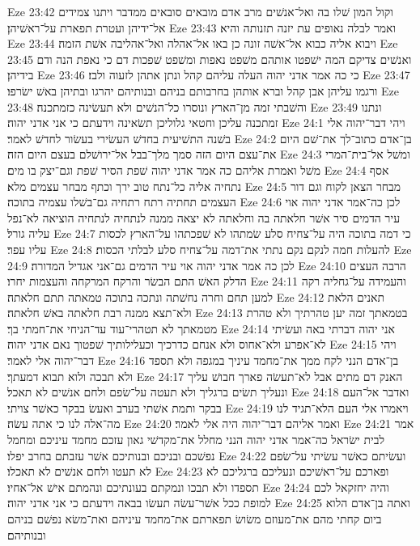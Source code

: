 Eze 23:42  וקול המון שׁלו בה ואל־אנשׁים מרב אדם מובאים סובאים ממדבר ויתנו צמידים אל־ידיהן ועטרת תפארת על־ראשׁיהן׃
Eze 23:43  ואמר לבלה נאופים עת יזנה תזנותה והיא׃
Eze 23:44  ויבוא אליה כבוא אל־אשׁה זונה כן באו אל־אהלה ואל־אהליבה אשׁת הזמה׃
Eze 23:45  ואנשׁים צדיקם המה ישׁפטו אותהם משׁפט נאפות ומשׁפט שׁפכות דם כי נאפת הנה ודם בידיהן׃
Eze 23:46  כי כה אמר אדני יהוה העלה עליהם קהל ונתן אתהן לזעוה ולבז׃
Eze 23:47  ורגמו עליהן אבן קהל וברא אותהן בחרבותם בניהם ובנותיהם יהרגו ובתיהן באשׁ ישׂרפו׃
Eze 23:48  והשׁבתי זמה מן־הארץ ונוסרו כל־הנשׁים ולא תעשׂינה כזמתכנה׃
Eze 23:49  ונתנו זמתכנה עליכן וחטאי גלוליכן תשׂאינה וידעתם כי אני אדני יהוה׃
Eze 24:1  ויהי דבר־יהוה אלי בשׁנה התשׁיעית בחדשׁ העשׂירי בעשׂור לחדשׁ לאמר׃
Eze 24:2  בן־אדם כתוב־לך את־שׁם היום את־עצם היום הזה סמך מלך־בבל אל־ירושׁלם בעצם היום הזה׃
Eze 24:3  ומשׁל אל־בית־המרי משׁל ואמרת אליהם כה אמר אדני יהוה שׁפת הסיר שׁפת וגם־יצק בו מים׃
Eze 24:4  אסף נתחיה אליה כל־נתח טוב ירך וכתף מבחר עצמים מלא׃
Eze 24:5  מבחר הצאן לקוח וגם דור העצמים תחתיה רתח רתחיה גם־בשׁלו עצמיה בתוכה׃
Eze 24:6  לכן כה־אמר אדני יהוה אוי עיר הדמים סיר אשׁר חלאתה בה וחלאתה לא יצאה ממנה לנתחיה לנתחיה הוציאה לא־נפל עליה גורל׃
Eze 24:7  כי דמה בתוכה היה על־צחיח סלע שׂמתהו לא שׁפכתהו על־הארץ לכסות עליו עפר׃
Eze 24:8  להעלות חמה לנקם נקם נתתי את־דמה על־צחיח סלע לבלתי הכסות׃
Eze 24:9  לכן כה אמר אדני יהוה אוי עיר הדמים גם־אני אגדיל המדורה׃
Eze 24:10  הרבה העצים הדלק האשׁ התם הבשׂר והרקח המרקחה והעצמות יחרו׃
Eze 24:11  והעמידה על־גחליה רקה למען תחם וחרה נחשׁתה ונתכה בתוכה טמאתה תתם חלאתה׃
Eze 24:12  תאנים הלאת ולא־תצא ממנה רבת חלאתה באשׁ חלאתה׃
Eze 24:13  בטמאתך זמה יען טהרתיך ולא טהרת מטמאתך לא תטהרי־עוד עד־הניחי את־חמתי בך׃
Eze 24:14  אני יהוה דברתי באה ועשׂיתי לא־אפרע ולא־אחוס ולא אנחם כדרכיך וכעלילותיך שׁפטוך נאם אדני יהוה׃
Eze 24:15  ויהי דבר־יהוה אלי לאמר׃
Eze 24:16  בן־אדם הנני לקח ממך את־מחמד עיניך במגפה ולא תספד ולא תבכה ולוא תבוא דמעתך׃
Eze 24:17  האנק דם מתים אבל לא־תעשׂה פארך חבושׁ עליך ונעליך תשׂים ברגליך ולא תעטה על־שׂפם ולחם אנשׁים לא תאכל׃
Eze 24:18  ואדבר אל־העם בבקר ותמת אשׁתי בערב ואעשׂ בבקר כאשׁר צויתי׃
Eze 24:19  ויאמרו אלי העם הלא־תגיד לנו מה־אלה לנו כי אתה עשׂה׃
Eze 24:20  ואמר אליהם דבר־יהוה היה אלי לאמר׃
Eze 24:21  אמר לבית ישׂראל כה־אמר אדני יהוה הנני מחלל את־מקדשׁי גאון עזכם מחמד עיניכם ומחמל נפשׁכם ובניכם ובנותיכם אשׁר עזבתם בחרב יפלו׃
Eze 24:22  ועשׂיתם כאשׁר עשׂיתי על־שׂפם לא תעטו ולחם אנשׁים לא תאכלו׃
Eze 24:23  ופארכם על־ראשׁיכם ונעליכם ברגליכם לא תספדו ולא תבכו ונמקתם בעונתיכם ונהמתם אישׁ אל־אחיו׃
Eze 24:24  והיה יחזקאל לכם למופת ככל אשׁר־עשׂה תעשׂו בבאה וידעתם כי אני אדני יהוה׃
Eze 24:25  ואתה בן־אדם הלוא ביום קחתי מהם את־מעוזם משׂושׂ תפארתם את־מחמד עיניהם ואת־משׂא נפשׁם בניהם ובנותיהם׃
